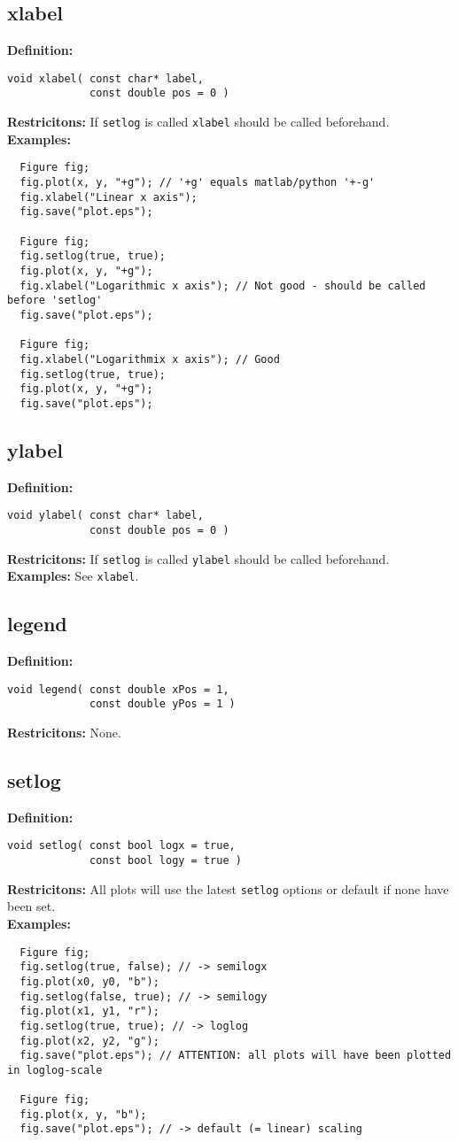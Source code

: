 \documentclass[a4paper]{article}
\newcommand{\command}[1]{\subsection{#1}}
\begin{document}
\command{xlabel}

\textbf{Definition:}
\begin{lstlisting}
void xlabel( const char* label, 
             const double pos = 0 )
\end{lstlisting}
%
\textbf{Restricitons:} If \texttt{setlog} is called \texttt{xlabel} should be called beforehand. \\
%
\textbf{Examples:}
\begin{lstlisting}
  Figure fig;
  fig.plot(x, y, "+g"); // '+g' equals matlab/python '+-g'
  fig.xlabel("Linear x axis");
  fig.save("plot.eps");

  Figure fig;
  fig.setlog(true, true);
  fig.plot(x, y, "+g");
  fig.xlabel("Logarithmic x axis"); // Not good - should be called before 'setlog'
  fig.save("plot.eps");

  Figure fig;
  fig.xlabel("Logarithmix x axis"); // Good
  fig.setlog(true, true);
  fig.plot(x, y, "+g");
  fig.save("plot.eps");
\end{lstlisting}

\command{ylabel}

\textbf{Definition:}
\begin{lstlisting}
void ylabel( const char* label, 
             const double pos = 0 )
\end{lstlisting}
%
\textbf{Restricitons:} If \texttt{setlog} is called \texttt{ylabel} should be called beforehand. \\
%
\textbf{Examples:} See \texttt{xlabel}.

\command{legend}

\textbf{Definition:}
\begin{lstlisting}
void legend( const double xPos = 1, 
             const double yPos = 1 )
\end{lstlisting}
%
\textbf{Restricitons:} None. 

\command{setlog}

\textbf{Definition:}
\begin{lstlisting}
void setlog( const bool logx = true, 
             const bool logy = true )
\end{lstlisting}
%
\textbf{Restricitons:} All plots will use the latest \texttt{setlog} options or default if none have been set. \\
%
\textbf{Examples:}
\begin{lstlisting}
  Figure fig;
  fig.setlog(true, false); // -> semilogx
  fig.plot(x0, y0, "b"); 
  fig.setlog(false, true); // -> semilogy
  fig.plot(x1, y1, "r");
  fig.setlog(true, true); // -> loglog
  fig.plot(x2, y2, "g");
  fig.save("plot.eps"); // ATTENTION: all plots will have been plotted in loglog-scale 

  Figure fig;
  fig.plot(x, y, "b");
  fig.save("plot.eps"); // -> default (= linear) scaling
\end{lstlisting}
\end{document}
